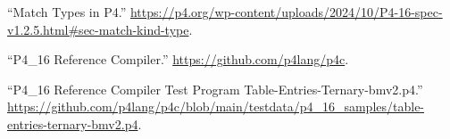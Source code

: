 \documentclass[11pt]{article}
\begin{document}
{{\begin{thebibliography}{45}
\mdbibitemlabel{{}[14]}\textquotedblleft{}Match Types in P4.\textquotedblright{} \href{https://p4.org/wp-content/uploads/2024/10/P4-16-spec-v1.2.5.html\%23sec-match-kind-type}{{\ttfamily https://\hspace{0pt}p4.\hspace{0pt}org/\hspace{0pt}wp-\hspace{0pt}content/\hspace{0pt}uploads/\hspace{0pt}2024/\hspace{0pt}10/\hspace{0pt}P4-\hspace{0pt}16-\hspace{0pt}spec-\hspace{0pt}v1.\hspace{0pt}2.\hspace{0pt}5.\hspace{0pt}html\#\hspace{0pt}sec-\hspace{0pt}match-\hspace{0pt}kind-\hspace{0pt}type}}.\label{p4matchtypes}%

\mdbibitemlabel{{}[15]}\textquotedblleft{}P4\_16 Reference Compiler.\textquotedblright{} \href{https://github.com/p4lang/p4c}{{\ttfamily https://\hspace{0pt}github.\hspace{0pt}com/\hspace{0pt}p4lang/\hspace{0pt}p4c}}.\label{p4c}%

\mdbibitemlabel{{}[16]}\textquotedblleft{}P4\_16 Reference Compiler Test Program Table-Entries-Ternary-bmv2.p4.\textquotedblright{} \href{https://github.com/p4lang/p4c/blob/main/testdata/p4_16_samples/table-entries-ternary-bmv2.p4}{{\ttfamily https://\hspace{0pt}github.\hspace{0pt}com/\hspace{0pt}p4lang/\hspace{0pt}p4c/\hspace{0pt}blob/\hspace{0pt}main/\hspace{0pt}testdata/\hspace{0pt}p4\_\hspace{0pt}16\_\hspace{0pt}samples/\hspace{0pt}table-\hspace{0pt}entries-\hspace{0pt}ternary-\hspace{0pt}bmv2.\hspace{0pt}p4}}.\label{p4ctestprogramforconstentries}%


\end{thebibliography}}}
\end{document}
